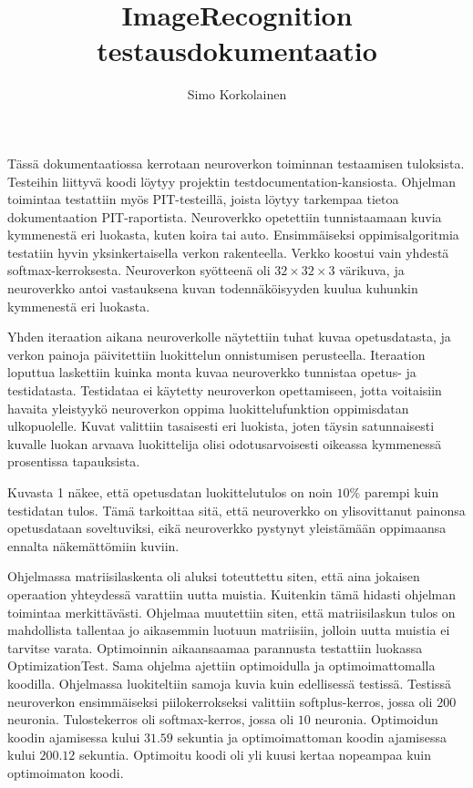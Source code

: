 \documentclass[12pt]{article}
\author{Simo Korkolainen}
\title{ImageRecognition testausdokumentaatio}
\begin{document}
  \maketitle
  Tässä dokumentaatiossa kerrotaan neuroverkon toiminnan testaamisen tuloksista. Testeihin liittyvä koodi löytyy projektin testdocumentation-kansiosta. Ohjelman toimintaa testattiin myös PIT-testeillä, joista löytyy tarkempaa tietoa dokumentaation PIT-raportista. Neuroverkko opetettiin tunnistaamaan kuvia kymmenestä eri luokasta, kuten koira tai auto.
  Ensimmäiseksi oppimisalgoritmia testatiin hyvin yksinkertaisella verkon rakenteella. Verkko koostui vain yhdestä softmax-kerroksesta. Neuroverkon syötteenä oli $32 \times 32 \times 3$ värikuva, ja neuroverkko antoi vastauksena kuvan todennäköisyyden kuulua kuhunkin kymmenestä eri luokasta.
  
Yhden iteraation aikana neuroverkolle näytettiin tuhat kuvaa opetusdatasta, ja verkon painoja päivitettiin luokittelun onnistumisen perusteella. Iteraation loputtua laskettiin kuinka monta kuvaa neuroverkko tunnistaa opetus- ja testidatasta. Testidataa ei käytetty neuroverkon opettamiseen, jotta voitaisiin havaita yleistyykö neuroverkon oppima luokittelufunktion  oppimisdatan ulkopuolelle.
Kuvat valittiin tasaisesti eri luokista, joten täysin satunnaisesti kuvalle luokan arvaava luokittelija olisi odotusarvoisesti oikeassa kymmenessä prosentissa tapauksista.

\begin{figure}
\caption{}
\end{figure}



Kuvasta 1 näkee, että opetusdatan luokittelutulos on noin  $10\%$ parempi kuin testidatan tulos. Tämä tarkoittaa sitä, että neuroverkko on ylisovittanut painonsa opetusdataan soveltuviksi, eikä neuroverkko pystynyt yleistämään oppimaansa ennalta näkemättömiin kuviin.


Ohjelmassa matriisilaskenta oli aluksi toteuttettu siten, että aina jokaisen operaation yhteydessä varattiin uutta muistia. Kuitenkin tämä hidasti ohjelman toimintaa merkittävästi. Ohjelmaa muutettiin siten, että matriisilaskun tulos on mahdollista tallentaa jo aikasemmin luotuun matriisiin, jolloin uutta muistia ei tarvitse varata. Optimoinnin aikaansaamaa parannusta testattiin luokassa OptimizationTest. Sama ohjelma ajettiin optimoidulla ja optimoimattomalla koodilla. Ohjelmassa luokiteltiin samoja kuvia kuin edellisessä testissä. Testissä neuroverkon ensimmäiseksi piilokerrokseksi valittiin softplus-kerros, jossa oli $200$ neuronia. Tulostekerros oli softmax-kerros, jossa oli $10$ neuronia. Optimoidun koodin ajamisessa kului $31.59$ sekuntia ja optimoimattoman koodin ajamisessa kului $200.12$ sekuntia. Optimoitu koodi oli yli kuusi kertaa nopeampaa kuin optimoimaton koodi.
\end{document}
